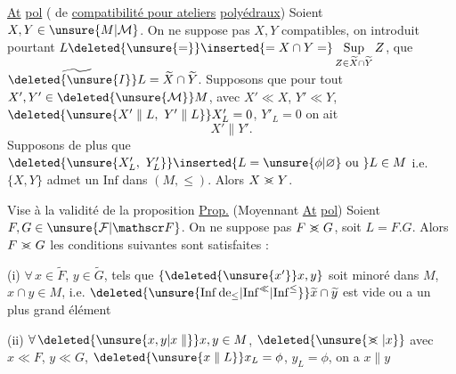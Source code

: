 \uline{At} \uline{pol}  ( de \uline{compatibilité pour ateliers} \uline{polyédraux}) Soient $X,Y\in\unsure{M|\mathcal M}$. On ne suppose pas $X,Y$ compatibles, on introduit pourtant $L\deleted{\unsure{=}}\inserted{=X\cap Y=}\mathop{\mathrm{Sup}}\limits_{Z\in\widetilde X\cap\widetilde Y}Z$,   que $\widetilde{\deleted{\unsure{I}}L}=\widetilde X\cap\widetilde Y$. Supposons que pour tout $X',Y'\in\deleted{\unsure{\mathcal M}}M$, avec
$X'\ll X$, $Y'\ll Y$, $\deleted{\unsure{X'\parallel L,\ Y'\parallel L}}X'_L=0$, $Y'_L=0$ on ait
\[
X'\parallel Y'.
\]
 Supposons de plus que $\deleted{\unsure{X'_L,\ Y'_L}}\inserted{L=\unsure{\phi|\varnothing}\text{ ou }}L\in M$ i.e. $\{X,Y\}$  admet un $\mathrm{Inf}$ dans $(M,\leq)$. Alors $X\mathrel{>\mkern-12mu<}Y$.

Vise à la validité de la proposition
\uline{Prop.} (Moyennant \uline{At} \uline{pol}) Soient $F,G\in\unsure{\mathcal F|\mathscr F}$. On ne suppose pas $F\mathrel{>\mkern-12mu<}G$, soit $L=F.G$.  Alors $F\mathrel{>\mkern-12mu<}G$  les conditions suivantes sont satisfaites :

(i) $\forall\,x\in\widetilde F$, $y\in\widetilde G$,  tels que $\{\deleted{\unsure{x'}}x,y\}$ soit minoré dans $M$, $x\cap y\in M$, i.e. $\deleted{\unsure{\mathrm{Inf}\,\mathrm{de}_{\leq}|\mathrm{Inf}^{\ll}|\mathrm{Inf}^{\leq}}}\widetilde x\cap\widetilde y$ est vide ou a un plus grand élément

(ii) $\forall\,\deleted{\unsure{x,y|x\parallel}}x,y\in M$, $\deleted{\unsure{\mathrel{>\mkern-12mu<}|x}}$ avec $x\ll F$, $y\ll G$, $\deleted{\unsure{x\parallel L}}x_L=\phi$, $y_L=\phi$, on  a $x\parallel y$
